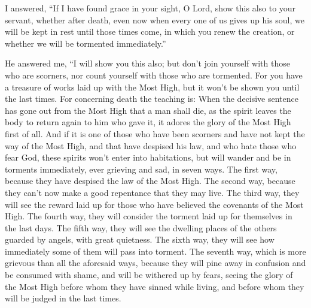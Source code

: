  I answered, ``If I have found grace in your sight, O
Lord, show this also to your servant, whether after death, even now when
every one of us gives up his soul, we will be kept in rest until those
times come, in which you renew the creation, or whether we will be
tormented immediately.''

 He answered me, ``I will show you this also; but don't
join yourself with those who are scorners, nor count yourself with those
who are tormented.  For you have a treasure of works laid
up with the Most High, but it won't be shown you until the last times.
 For concerning death the teaching is: When the decisive
sentence has gone out from the Most High that a man shall die, as the
spirit leaves the body to return again to him who gave it, it adores the
glory of the Most High first of all.  And if it is one of
those who have been scorners and have not kept the way of the Most High,
and that have despised his law, and who hate those who fear God,
 these spirits won't enter into habitations, but will
wander and be in torments immediately, ever grieving and sad, in seven
ways.  The first way, because they have despised the law
of the Most High.  The second way, because they can't now
make a good repentance that they may live.  The third
way, they will see the reward laid up for those who have believed the
covenants of the Most High.  The fourth way, they will
consider the torment laid up for themselves in the last days.
 The fifth way, they will see the dwelling places of the
others guarded by angels, with great quietness.  The
sixth way, they will see how immediately some of them will pass into
torment.  The seventh way, which is more grievous than
all the aforesaid ways, because they will pine away in confusion and be
consumed with shame, and will be withered up by fears, seeing the glory
of the Most High before whom they have sinned while living, and before
whom they will be judged in the last times.

